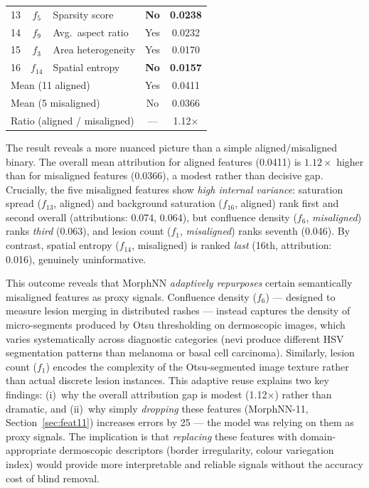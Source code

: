 \documentclass[preprint,12pt]{elsarticle}
\begin{document}
\begin{table}[htbp]
\begin{tabular}{rclcc}
13 & $f_5$    & Sparsity score       & \textbf{No}  & \textbf{0.0238} \\
14 & $f_9$    & Avg.\ aspect ratio   & Yes & 0.0232 \\
15 & $f_3$    & Area heterogeneity   & Yes & 0.0170 \\
16 & $f_{14}$ & Spatial entropy      & \textbf{No}  & \textbf{0.0157} \\
\midrule
\multicolumn{3}{l}{Mean (11 aligned)}   & Yes & 0.0411 \\
\multicolumn{3}{l}{Mean (5 misaligned)} & No  & 0.0366 \\
\multicolumn{3}{l}{Ratio (aligned / misaligned)} & --- & 1.12$\times$ \\
\bottomrule
\end{tabular}
\end{table}

The result reveals a more nuanced picture than a simple aligned/misaligned
binary.  The overall mean attribution for aligned features (0.0411) is
$1.12\times$ higher than for misaligned features (0.0366), a modest
rather than decisive gap.  Crucially, the five misaligned features show
\emph{high internal variance}: saturation spread ($f_{13}$, aligned)
and background saturation ($f_{16}$, aligned) rank first and second
overall (attributions: 0.074, 0.064), but confluence density ($f_6$,
\emph{misaligned}) ranks \emph{third} (0.063), and lesion count
($f_1$, \emph{misaligned}) ranks seventh (0.046).  By contrast,
spatial entropy ($f_{14}$, misaligned) is ranked \emph{last} (16th,
attribution: 0.016), genuinely uninformative.

This outcome reveals that MorphNN \emph{adaptively repurposes} certain
semantically misaligned features as proxy signals.  Confluence density
($f_6$) --- designed to measure lesion merging in distributed rashes
--- instead captures the density of micro-segments produced by Otsu
thresholding on dermoscopic images, which varies systematically across
diagnostic categories (nevi produce different HSV segmentation patterns
than melanoma or basal cell carcinoma).  Similarly, lesion count ($f_1$)
encodes the complexity of the Otsu-segmented image texture rather than
actual discrete lesion instances.  This adaptive reuse explains two key
findings: (i)~why the overall attribution gap is modest (1.12$\times$)
rather than dramatic, and (ii)~why simply \emph{dropping} these features
(MorphNN-11, Section~\ref{sec:feat11}) increases errors by 25 --- the
model was relying on them as proxy signals.  The implication is that
\emph{replacing} these features with domain-appropriate dermoscopic
descriptors (border irregularity, colour variegation index) would
provide more interpretable and reliable signals without the accuracy
cost of blind removal.
\end{document}
